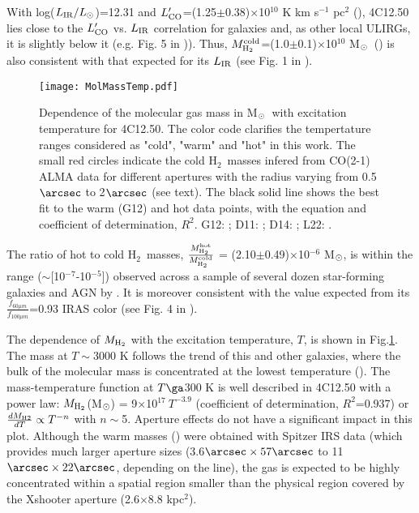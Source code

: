 \documentclass{aa}
\newcommand{\hmol}{H$_2$~}
\newcommand{\msun}{M$_{\rm \odot}$~}
\newcommand{\msunb}{M$_{\rm \odot}$}
\begin{document}
With log($L_{\rm IR}/L_{\rm \odot}$)=12.31 and $L'_{\rm CO}$=(1.25$\pm$0.38)$\times$10$^{10}$ K km s$^{-1}$ pc$^2$ (\citealt{Dasyra2012}), 4C12.50 lies close to   the $L'_{\rm CO}$ vs. $L_{\rm IR}$ correlation for galaxies and, as other local ULIRGs, it is slightly below it (e.g. Fig. 5 in \citealt{Cortzen2019})). Thus, $M_{\rm H_2}^{\rm cold}$=(1.0$\pm$0.1)$\times$10$^{10}$ \msun (\citealt{Dasyra2014})  is also consistent with that expected for its $L_{\rm IR}$  (see Fig. 1 in \citealt{Daddi2010a}). 


\begin{figure}
\centering
\texttt{[image: MolMassTemp.pdf]}
\caption{Dependence of the molecular gas mass  in \msun with excitation temperature  for 4C12.50. The color code clarifies the tempertature ranges considered as "cold", "warm" and "hot" in this work. The small red circles indicate the cold \hmol masses infered from CO(2-1) ALMA data for different apertures with the radius varying from 0.5$\arcsec$ to 2$\arcsec$ (see text). The black solid  line shows the best fit to the warm (G12) and hot data points, with the equation and coefficient of determination, $R^2$. G12: \cite{Guillard2012}; D11: \cite{Dasyra2011}; D14: \cite{Dasyra2014}; L22: \cite{Lamperti2022}.}
\label{mass-temp}
\end{figure}

The  ratio of  hot  to cold \hmol masses, $\frac{M_{\rm H_2}^{\rm hot}}{M_{\rm H_2}^{\rm cold}}$ = (2.10$\pm$0.49)$\times$10$^{-6}$ M$_{\rm \odot}$, is within the range ($\sim$[10$^{-7}$-10$^{-5}$]) observed across a sample of several dozen star-forming galaxies and AGN by \cite{Dale2005}. It   is moreover consistent with the value expected from its $\frac{f_{60 \mu m}}{f_{100 \mu m}}$=0.93 IRAS color (see Fig. 4 in \citealt{Dale2005}).  


The dependence of  $M_{\rm H_2}$ with the excitation temperature, $T$, is shown in   Fig.\ref{mass-temp}. 
The mass at $T\sim$3000 K follows the trend of this and other galaxies, where the  bulk of the  molecular mass  is concentrated at the lowest temperature (\citealt{Guillard2012}). The mass-temperature function at $T\ga$300 K is well described in 4C12.50 with a power law: $M_{\rm H_2}$(\msunb) = 9$\times$10$^{17} ~T^{-3.9}$ (coefficient of determination, $R^2$=0.937) or $\frac{d M_{\rm H2}}{dT}\propto T^{-n}$ with $n\sim$5.
Aperture effects do not have a significant impact in this plot. 
Although the warm masses (\citealt{Guillard2012}) were obtained with  Spitzer IRS data (which provides much larger aperture sizes (3.6$\arcsec \times 57\arcsec$ to 11$\arcsec \times 22\arcsec$, depending on the line), the gas is expected to be highly concentrated within a spatial region smaller than the physical region covered by the  Xshooter aperture (2.6$\times$8.8 kpc$^2$).
\end{document}
